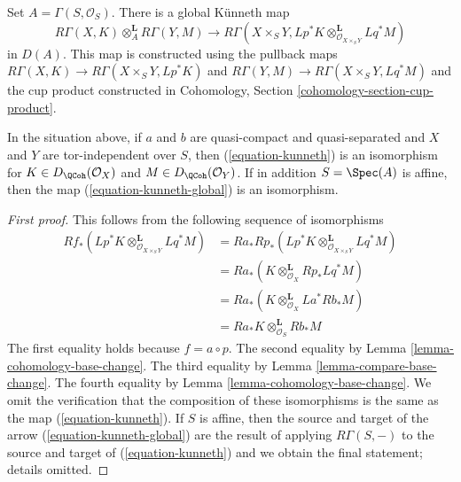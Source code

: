 \medskip\noindent
Set $A = \Gamma(S, \mathcal{O}_S)$. There is a global K\"unneth map
\begin{equation}
\label{equation-kunneth-global}
R\Gamma(X, K) \otimes_A^\mathbf{L} R\Gamma(Y, M)
\longrightarrow
R\Gamma(X \times_S Y,
Lp^*K \otimes_{\mathcal{O}_{X \times_S Y}}^\mathbf{L} Lq^*M)
\end{equation}
in $D(A)$. This map is constructed using the pullback maps
$R\Gamma(X, K) \to R\Gamma(X \times_S Y, Lp^*K)$ and
$R\Gamma(Y, M) \to R\Gamma(X \times_S Y, Lq^*M)$ and
the cup product constructed in
Cohomology, Section \ref{cohomology-section-cup-product}.

\begin{lemma}
\label{lemma-kunneth}
In the situation above, if $a$ and $b$ are quasi-compact and quasi-separated
and $X$ and $Y$ are tor-independent over $S$, then (\ref{equation-kunneth})
is an isomorphism for $K \in D_\QCoh(\mathcal{O}_X)$ and
$M \in D_\QCoh(\mathcal{O}_Y)$. If in addition $S = \Spec(A)$ is affine,
then the map (\ref{equation-kunneth-global}) is an isomorphism.
\end{lemma}

\begin{proof}[First proof]
This follows from the following sequence of isomorphisms
\begin{align*}
Rf_*(Lp^*K \otimes_{\mathcal{O}_{X \times_S Y}}^\mathbf{L} Lq^*M)
& =
Ra_*Rp_*(Lp^*K \otimes_{\mathcal{O}_{X \times_S Y}}^\mathbf{L} Lq^*M) \\
& =
Ra_*(K \otimes_{\mathcal{O}_X}^\mathbf{L} Rp_*Lq^*M) \\
& =
Ra_*(K \otimes_{\mathcal{O}_X}^\mathbf{L} La^*Rb_*M) \\
& =
Ra_*K \otimes_{\mathcal{O}_S}^\mathbf{L} Rb_*M
\end{align*}
The first equality holds because $f = a \circ p$. The second equality
by Lemma \ref{lemma-cohomology-base-change}. The third equality by
Lemma \ref{lemma-compare-base-change}.  The fourth equality by
Lemma \ref{lemma-cohomology-base-change}.
We omit the verification that the composition of these isomorphisms
is the same as the map (\ref{equation-kunneth}).
If $S$ is affine, then the source and target of the arrow
(\ref{equation-kunneth-global}) are the result of applying
$R\Gamma(S, -)$ to the source and target of (\ref{equation-kunneth})
and we obtain the final statement; details omitted.
\end{proof}

